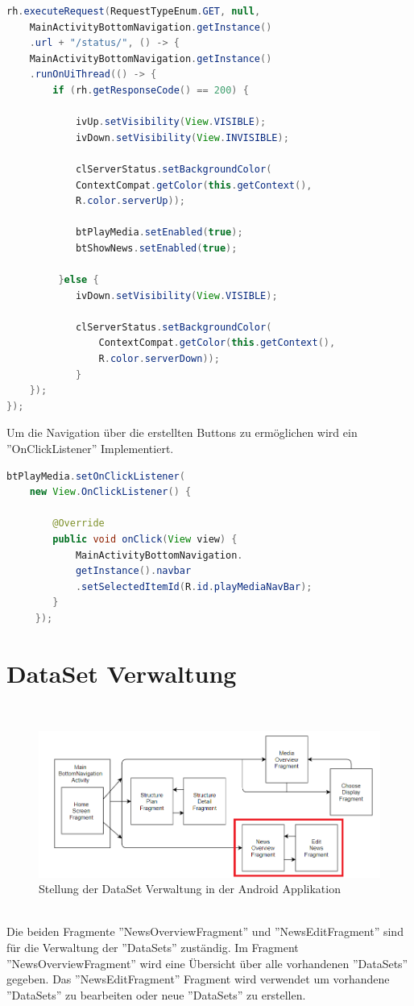 \begin{lstlisting}[language=Java,caption={Status Request im HomeScreenFragment}]
rh.executeRequest(RequestTypeEnum.GET, null,
	MainActivityBottomNavigation.getInstance()
	.url + "/status/", () -> {   
    MainActivityBottomNavigation.getInstance()
    .runOnUiThread(() -> {
      	if (rh.getResponseCode() == 200) {
        	
           	ivUp.setVisibility(View.VISIBLE);
            ivDown.setVisibility(View.INVISIBLE);
                
            clServerStatus.setBackgroundColor(
           	ContextCompat.getColor(this.getContext(),
           	R.color.serverUp));
                	
            btPlayMedia.setEnabled(true);
            btShowNews.setEnabled(true);
                    
         }else {
         	ivDown.setVisibility(View.VISIBLE);
                    
            clServerStatus.setBackgroundColor(
            	ContextCompat.getColor(this.getContext(),
                R.color.serverDown));
            }
    });
});
\end{lstlisting}
Um die Navigation über die erstellten Buttons zu ermöglichen wird ein ''OnClickListener'' Implementiert.
\begin{lstlisting}[language=Java,caption={OnClickListener für die direkte Navigation über Buttons im HomeScreenFragment}]
btPlayMedia.setOnClickListener(
	new View.OnClickListener() {
            
    	@Override
        public void onClick(View view) {
            MainActivityBottomNavigation.
            getInstance().navbar
            .setSelectedItemId(R.id.playMediaNavBar);
        }
     });
\end{lstlisting}
\section{DataSet Verwaltung}
\\
\begin{figure}[H]
\centering
\includegraphics[width=1.0\textwidth]{images/06_AndroidApp/06_AndroidArchShowNews}
\caption{Stellung der DataSet Verwaltung in der Android Applikation}
\label{fig:mediaNav}
\end{figure}
\\
Die beiden Fragmente  ''NewsOverviewFragment'' und ''NewsEditFragment'' sind für die Verwaltung der ''DataSets'' zuständig. Im Fragment ''NewsOverviewFragment'' wird eine Übersicht über alle vorhandenen ''DataSets'' gegeben. Das ''NewsEditFragment'' Fragment wird verwendet um vorhandene ''DataSets'' zu bearbeiten oder neue ''DataSets'' zu erstellen. 

